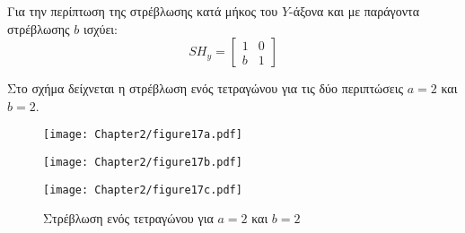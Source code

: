 \begin{solution}
\begin{enumerate}
Για την περίπτωση της στρέβλωσης κατά μήκος του $Y$-άξονα και με παράγοντα στρέβλωσης $b$ ισχύει:
\[
SH_y = \begin{bmatrix}
1 & 0 \\
b & 1
\end{bmatrix}
\]


Στο σχήμα  δείχνεται η στρέβλωση ενός τετραγώνου για τις δύο περιπτώσεις $a=2$ και $b=2$.

\begin{figure}[h!]
	\begin{center}
		\begin{minipage}[b]{0.19\textwidth} %
		    \texttt{[image: Chapter2/figure17a.pdf]}
		\end{minipage}%
	\hfill
		\begin{minipage}[b]{0.4\textwidth} %
		    \texttt{[image: Chapter2/figure17b.pdf]}
		\end{minipage}
	\hfill
		\begin{minipage}[b]{0.4\textwidth} %
		    \texttt{[image: Chapter2/figure17c.pdf]}
		\end{minipage}
	\end{center}
\caption{Στρέβλωση ενός τετραγώνου για $a=2$ και $b=2$}
\end{figure}

\end{enumerate}

\end{solution}
